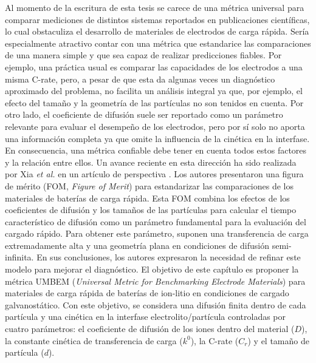 Al momento de la escritura de esta tesis se carece de una métrica universal 
para comparar mediciones de distintos sistemas reportados en publicaciones
científicas, lo cual obstaculiza el desarrollo de materiales de electrodos de
carga rápida. Sería especialmente atractivo contar con una métrica que 
estandarice las comparaciones de una manera simple y que sea capaz de realizar
predicciones fiables. Por ejemplo, una práctica usual es comparar las 
capacidades de los electrodos a una misma C-rate, pero, a pesar de que esta da algunas
veces un diagnóstico aproximado del problema, no facilita un análisis 
integral ya que, por ejemplo, el efecto del tamaño y la geometría de las 
partículas no son tenidos en cuenta. Por otro lado, el coeficiente de difusión
suele ser reportado como un parámetro relevante para evaluar el desempeño de los electrodos,
pero por sí solo no aporta una información completa ya que omite la 
influencia de la cinética en la interfase. En consecuencia, una métrica confiable 
debe tener en cuenta todos estos factores y la relación entre ellos. Un avance
reciente en esta dirección ha sido realizada por Xia \textit{et al.} 
en un artículo de perspectiva \cite{xia2022}. Los autores presentaron una 
figura de mérito (FOM, \textit{Figure of Merit}) para estandarizar las 
comparaciones de los materiales de baterías de carga rápida. Esta FOM combina
los efectos de los coeficientes de difusión y los tamaños de las partículas 
para calcular el tiempo característico de difusión como un parámetro 
fundamental para la evaluación del cargado rápido. Para obtener este parámetro,
suponen una transferencia de carga extremadamente alta y una geometría plana 
en condiciones de difusión semi-infinita. En sus conclusiones, los autores 
expresaron la necesidad de refinar este modelo para mejorar el diagnóstico. 
El objetivo de este capítulo es proponer la métrica UMBEM (\textit{Universal
Metric for Benchmarking Electrode Materials}) para materiales de carga rápida
de baterías de ion-litio en condiciones de cargado galvanostático. Con este
objetivo, se considera una difusión finita dentro de cada partícula y una cinética en la interfase electrolito/partícula 
controladas por cuatro parámetros: el coeficiente de difusión de los iones 
dentro del material ($D$), la constante cinética de transferencia de carga
($k^0$), la C-rate ($C_r$) y el tamaño de partícula ($d$).

